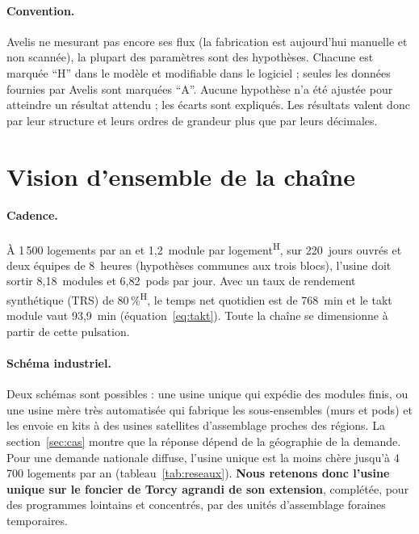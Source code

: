 \documentclass[11pt,a4paper]{article}
\newcommand{\hyp}{\textsuperscript{\textsf{H}}}
\begin{document}
\paragraph{Convention.} Avelis ne mesurant pas encore ses flux (la fabrication est aujourd'hui
manuelle et non scannée), la plupart des paramètres sont des hypothèses. Chacune est marquée
\enquote{H} dans le modèle et modifiable dans le logiciel ; seules les données fournies par Avelis
sont marquées \enquote{A}. Aucune hypothèse n'a été ajustée pour atteindre un résultat attendu ;
les écarts sont expliqués. Les résultats valent donc par leur structure et leurs ordres de
grandeur plus que par leurs décimales.

\section{Vision d'ensemble de la chaîne}\label{sec:vision}

\paragraph{Cadence.} À 1\,500 logements par an et 1,2~module par logement\hyp{}, sur 220~jours
ouvrés et deux équipes de 8~heures (hypothèses communes aux trois blocs), l'usine doit sortir
8,18~modules et 6,82~pods par jour. Avec un taux de rendement synthétique (TRS) de 80\,\%\hyp{},
le temps net quotidien est de 768~min et le takt module vaut 93,9~min (équation~\eqref{eq:takt}).
Toute la chaîne se dimensionne à partir de cette pulsation.

\paragraph{Schéma industriel.} Deux schémas sont possibles : une usine unique qui expédie des
modules finis, ou une usine mère très automatisée qui fabrique les sous-ensembles (murs et pods)
et les envoie en kits à des usines satellites d'assemblage proches des régions. La
section~\ref{sec:cas} montre que la réponse dépend de la géographie de la demande. Pour une
demande nationale diffuse, l'usine unique est la moins chère jusqu'à 4\,700 logements par an
(tableau~\ref{tab:reseaux}). \textbf{Nous retenons donc l'usine unique sur le foncier de Torcy
agrandi de son extension}, complétée, pour des programmes lointains et concentrés, par des unités
d'assemblage foraines temporaires.
\end{document}
